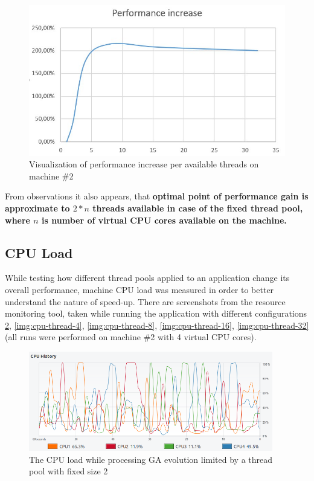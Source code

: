 \begin{figure}[h]
\centering\includegraphics[width=.8\textwidth]{img/exp/2/ubuntu-performance-increase}
\caption{Visualization of performance increase per available threads on machine \#2}  \label{img:ub-perf}
\end{figure}

From observations it also appears, that \textbf{optimal point of performance gain is approximate to \( 2 * n\) threads available in case of the fixed thread pool, where \(n\) is number of virtual CPU cores available on the machine.}

\subsection{CPU Load}

While testing how different thread pools applied to an application change its overall performance, machine CPU load was measured in order to better understand the nature of speed-up. There are screenshots from the resource monitoring tool, taken while running the application with different configurations \ref{img:cpu-thread-2}, \ref{img:cpu-thread-4}, \ref{img:cpu-thread-8}, \ref{img:cpu-thread-16}, \ref{img:cpu-thread-32} (all runs were performed on machine \#2 with 4 virtual CPU cores).

\begin{figure}[h]
\centering\includegraphics[width=0.95\textwidth]{img/exp/2/limit-threadpool-2}
\caption{The CPU load while processing GA evolution limited by a thread pool with fixed size 2 }  \label{img:cpu-thread-2}
\end{figure}

